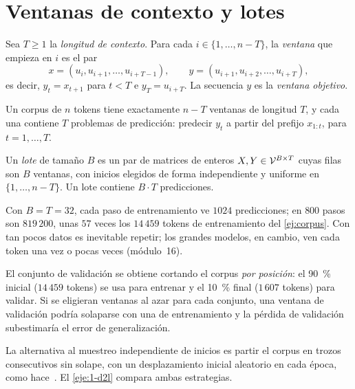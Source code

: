 \section{Ventanas de contexto y lotes}

\begin{definicion}\label{def:ventana}
Sea $T\ge 1$ la \emph{longitud de contexto}. Para cada $i\in\{1,\dots,n-T\}$, la \emph{ventana} que empieza en $i$ es el par
\[
x=(u_i,u_{i+1},\dots,u_{i+T-1}),\qquad y=(u_{i+1},u_{i+2},\dots,u_{i+T}),
\]
es decir, $y_t=x_{t+1}$ para $t<T$ e $y_T=u_{i+T}$. La secuencia $y$ es la \emph{ventana objetivo}.
\end{definicion}

\begin{proposicion}\label{prop:ventanas}
Un corpus de $n$ tokens tiene exactamente $n-T$ ventanas de longitud $T$, y cada una contiene $T$ problemas de predicción: predecir $y_t$ a partir del prefijo $x_{1:t}$, para $t=1,\dots,T$.
\end{proposicion}

\addtocounter{definicion}{1}%

\begin{definicion}[Lote]\label{def:lote}
Un \emph{lote} de tamaño $B$ es un par de matrices de enteros $X,Y\in\mathcal{V}^{B\times T}$ cuyas filas son $B$ ventanas, con inicios elegidos de forma independiente y uniforme en $\{1,\dots,n-T\}$. Un lote contiene $B\cdot T$ predicciones.
\end{definicion}

Con $B=T=32$, cada paso de entrenamiento ve $1024$ predicciones; en $800$ pasos son $819\,200$, unas $57$ veces los $14\,459$ tokens de entrenamiento del \cref{ej:corpus}. Con tan pocos datos es inevitable repetir; los grandes modelos, en cambio, ven cada token una vez o pocas veces (módulo~16).

\begin{observacion}\label{obs:particion}
El conjunto de validación se obtiene cortando el corpus \emph{por posición}: el 90~\% inicial ($14\,459$ tokens) se usa para entrenar y el 10~\% final ($1\,607$ tokens) para validar. Si se eligieran ventanas al azar para cada conjunto, una ventana de validación podría solaparse con una de entrenamiento y la pérdida de validación subestimaría el error de generalización.
\end{observacion}

La alternativa al muestreo independiente de inicios es partir el corpus en trozos consecutivos sin solape, con un desplazamiento inicial aleatorio en cada época, como hace~\cite[§9.3.3]{d2l}. El \cref{eje:1-d2l} compara ambas estrategias.

